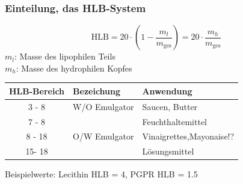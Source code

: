 \documentclass{beamer} %
\begin{document}
\begin{frame}
\frametitle{Einteilung, das HLB-System}
\begin{block}{}
\begin{equation}
\text{HLB} = 20 \cdot \left(1-\frac{m_l}{m_{\text{ges}}}\right) = 20 \cdot \frac{m_h}{m_{\text{ges}}}
\end{equation}
$m_l$: Masse des lipophilen Teils \\
$m_h$: Masse des hydrophilen Kopfes
\end{block}


\pause
\begin{table}[H]
   \centering
   \begin{tabular}{|c|l|l|}
   \hline
   HLB-Bereich & Bezeichung &  Anwendung  \\
   \hline
   3 - 8 & W/O Emulgator & Saucen, Butter \\
   7 - 8 & & Feuchthaltemittel \\
   8 - 18 & O/W Emulgator & Vinaigrettes,Mayonaise!? \\
   15- 18 & & Lösungsmittel \\
   \hline   
   \end{tabular}
\end{table}%
\begin{block}{}
Beispielwerte: Lecithin HLB = 4, PGPR HLB = 1.5
\end{block}


\end{frame}
\end{document}

